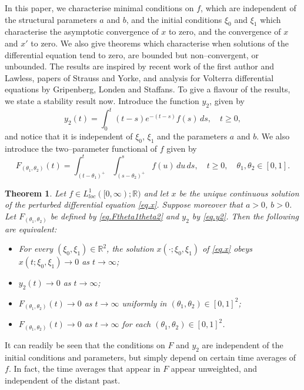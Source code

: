 \documentclass[10pt,reqno]{amsart}
\newtheorem{theorem}{Theorem}
\theoremstyle{definition}
\begin{document}
	In this paper, we characterise minimal conditions on $f$, which are independent of the structural parameters $a$ and $b$, and the initial conditions $\xi_0$ and $\xi_1$ which characterise the asymptotic convergence of $x$ to zero, and the convergence of $x$ and $x'$ to zero. We also give theorems which characterise when solutions of the differential equation tend to zero, are bounded but non--convergent, or unbounded. The results are inspired by recent work of the first author and Lawless, papers of Strauss and Yorke, and analysis for Volterra differential equations by Gripenberg, Londen and Staffans. To give a flavour of the results, we state a stability result now. Introduce the function $y_2$, given by 
	\begin{equation} \label{eq.y2}
		y_2(t)=\int_0^t (t-s)e^{-(t-s)}f(s)\,ds, \quad t\geq 0,
	\end{equation}
	and notice that it is independent of $\xi_0$, $\xi_1$ and the parameters $a$ and $b$. We also introduce the two--parameter functional of $f$ given by 
	\begin{equation} \label{eq.Ftheta1theta2}
		F_{(\theta_1,\theta_2)}(t)=\int_{(t-\theta_1)^+}^t \int_{(s-\theta_2)^+}^s f(u)\,du \,ds, \quad t\geq 0, \quad \theta_1,\theta_2 \in [0,1].
	\end{equation}
	\begin{theorem} \label{thm.xxprxprprfintint} 
		Let $f\in L^1_{loc}([0,\infty);\mathbb{R})$ and let $x$ be the unique continuous solution of the perturbed differential equation \eqref{eq.x}. Suppose moreover that $a>0$, $b>0$. Let $F_{(\theta_1,\theta_2)}$ be defined by \eqref{eq.Ftheta1theta2} and $y_2$ by \eqref{eq.y2}. Then the following are equivalent:
		\begin{itemize}
			\item[(i)] For every $(\xi_0,\xi_1)\in \mathbb{R}^2$, the solution $x(\cdot;\xi_0,\xi_1)$ of \eqref{eq.x} obeys $x(t;\xi_0,\xi_1)\to 0$ as $t\to\infty$;
			\item[(ii)] $y_2(t)\to 0$ as $t\to\infty$; 
			\item[(iii)] $F_{(\theta_1,\theta_2)}(t)\to 0$ as $t\to\infty$ uniformly in $(\theta_1,\theta_2)\in [0,1]^2$;
			\item[(iv)]  $F_{(\theta_1,\theta_2)}(t)\to 0$ as $t\to\infty$ for each  $(\theta_1,\theta_2)\in [0,1]^2$.
		\end{itemize}
	\end{theorem}
	It can readily be seen that the conditions on $F$ and $y_2$ are independent of the initial conditions and parameters, but simply depend on certain time averages of $f$. In fact, the time averages that appear in $F$ appear unweighted, and independent of the distant past. 
	
\end{document}
